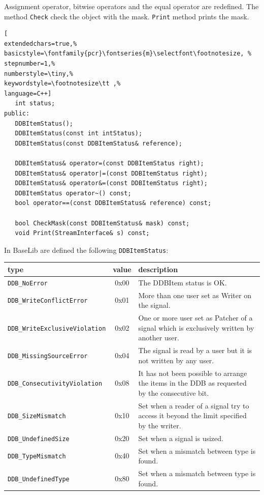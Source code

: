 Assignment operator, bitwise operators and the equal operator are redefined. The method \texttt{Check} check the object with the mask. \texttt{Print} method prints the mask.
\begin{lstlisting}[
extendedchars=true,%
basicstyle=\fontfamily{pcr}\fontseries{m}\selectfont\footnotesize, %
stepnumber=1,%
numberstyle=\tiny,%
keywordstyle=\footnotesize\tt ,%
language=C++]
   int status;
public:
   DDBItemStatus();
   DDBItemStatus(const int intStatus);
   DDBItemStatus(const DDBItemStatus& reference);

   DDBItemStatus& operator=(const DDBItemStatus right);
   DDBItemStatus& operator|=(const DDBItemStatus right);
   DDBItemStatus& operator&=(const DDBItemStatus right);
   DDBItemStatus operator~() const;
   bool operator==(const DDBItemStatus& reference) const;

   bool CheckMask(const DDBItemStatus& mask) const;
   void Print(StreamInterface& s) const;
\end{lstlisting}

In BaseLib are defined the following \texttt{DDBItemStatus}:

\begin{table}[!h]
 \begin{center}
  \begin{tabular}{|l|c|l|}
   \hline
type & value & description \\
   \hline
\texttt{DDB\_NoError} & 0x00 & The DDBItem status is OK. \\
\texttt{DDB\_WriteConflictError} & 0x01 & More than one user set as Writer on the signal. \\
\texttt{DDB\_WriteExclusiveViolation} & 0x02 & One or more user set as Patcher of a signal which is exclusively written by another user. \\
\texttt{DDB\_MissingSourceError} & 0x04 & The signal is read by a user but it is not written by any user. \\
\texttt{DDB\_ConsecutivityViolation} & 0x08 & It has not been possible to arrange the items in the DDB as requested by the consecutive bit. \\
\texttt{DDB\_SizeMismatch} & 0x10 & Set when a reader of a signal try to access it beyond the limit specified by the writer. \\
\texttt{DDB\_UndefinedSize} & 0x20 & Set when a signal is usized. \\
\texttt{DDB\_TypeMismatch} & 0x40 & Set when a mismatch between type is found. \\
\texttt{DDB\_UndefinedType} & 0x80 & Set when a mismatch between type is found. \\
   \hline
  \end{tabular}
 \end{center}
\end{table}



